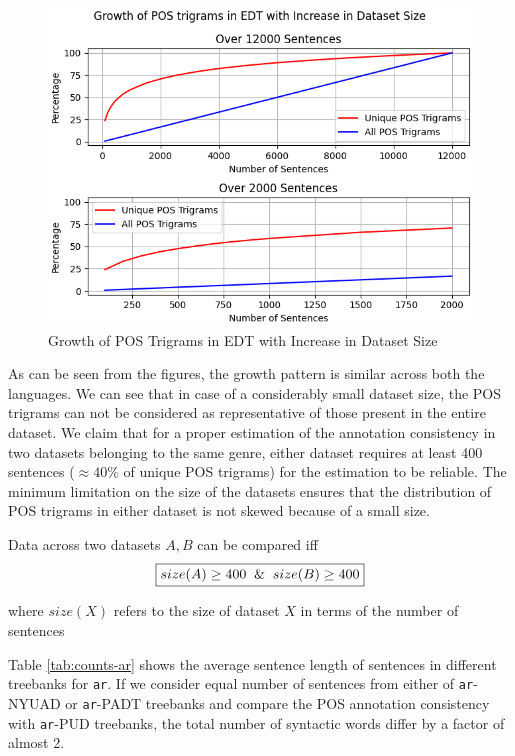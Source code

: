 \begin{figure}[H]
    \centering
    \includegraphics[scale=0.75]{img/trigram-stats-EDT.png}
    \caption{Growth of POS Trigrams in EDT with Increase in Dataset Size}
    \label{fig:trigram-EDT}
\end{figure}

As can be seen from the figures, the growth pattern is similar across both the languages. We can see that in case of a considerably small dataset size, the POS trigrams can not be considered as representative of those present in the entire dataset. We claim that for a proper estimation of the annotation consistency in two datasets belonging to the same genre, either dataset requires at least 400 sentences ($\approx 40\%$ of unique POS trigrams) for the estimation to be reliable. The minimum limitation on the size of the datasets ensures that the distribution of POS trigrams in either dataset is not skewed because of a small size.

\begin{claim}
Data across two datasets $A, B$ can be compared iff \\
\begin{equation*}
    \boxed{size(A) \geq 400 \And size(B) \geq 400}
\end{equation*}
\label{claim:pos_size_init}
\end{claim}

where $size(X)$ refers to the size of dataset $X$ in terms of the number of sentences

Table \ref{tab:counts-ar} shows the average sentence length of sentences in different treebanks for \verb|ar|. If we consider equal number of sentences from either of \verb|ar|-NYUAD or \verb|ar|-PADT treebanks and compare the POS annotation consistency with \verb|ar|-PUD treebanks, the total number of syntactic words differ by a factor of almost 2. 

